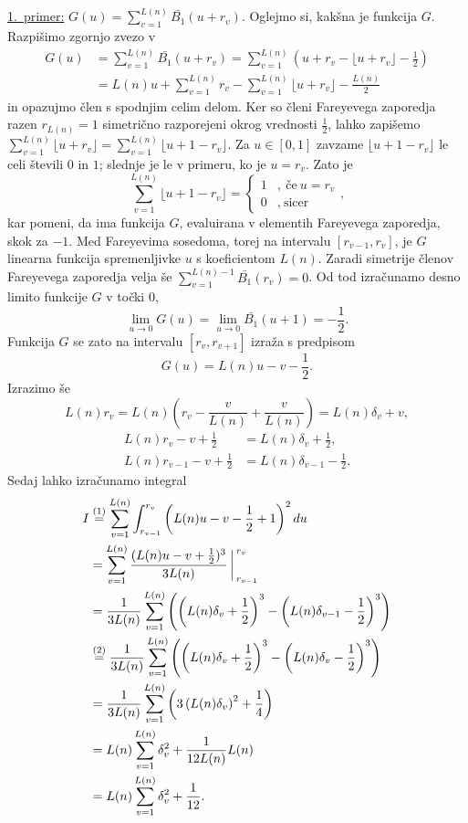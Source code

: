 \documentclass[mat1]{fmfdelo}
\begin{document}
\underline{1.~primer:} $G(u) = \sum_{v=1}^{L(n)} \bar{B_{1}}(u+r_v)$.
Oglejmo si, kakšna je funkcija $G$. Razpišimo zgornjo zvezo v
\begin{align}
G(u) &= \sum_{v=1}^{L(n)} \bar{B_{1}}(u+r_v) = \sum_{v=1}^{L(n)} \left(u+r_v - \lfloor u+r_v \rfloor - \frac{1}{2} \right) \nonumber \\
       &= L(n)u + \sum_{v=1}^{L(n)}r_v - \sum_{v=1}^{L(n)} \lfloor u+r_v \rfloor - \frac{L(n)}{2}
\end{align}
in opazujmo člen s spodnjim celim delom. Ker so členi Fareyevega zaporedja razen $r_{L(n)}=1$ simetrično razporejeni okrog vrednosti $\frac{1}{2}$, lahko zapišemo $\sum_{v=1}^{L(n)} \lfloor u+r_v \rfloor = \sum_{v=1}^{L(n)} \lfloor u+1-r_v \rfloor$. Za $u\in[0,1]$ zavzame $\lfloor u+1-r_v \rfloor$ le celi števili $0$ in $1$; slednje je le v primeru, ko je $u=r_{v}$. Zato je 
\[
\sum_{v=1}^{L(n)} \lfloor u+1-r_v \rfloor = \left\{
\begin{array}{rl}
	1 &,\ \textrm{če}\ u = r_{v}\\
	0 &,\ \textrm{sicer}
\end{array},
\right.
\]
kar pomeni, da ima funkcija $G$, evaluirana v elementih Fareyevega zaporedja, skok za $-1$. Med Fareyevima sosedoma, torej na intervalu $[r_{v-1},r_{v}]$, je $G$ linearna funkcija spremenljivke $u$ s koeficientom $L(n)$.
Zaradi simetrije členov Fareyevega zaporedja velja še $\sum_{v=1}^{L(n)-1} \bar{B_{1}}(r_v) = 0$. Od tod izračunamo desno limito funkcije $G$ v točki $0$,
\[ \lim_{u \to 0} G(u) = \lim_{u \to 0} \bar{B_{1}}(u+1) = -\frac{1}{2}. \]
Funkcija $G$ se zato na intervalu $[r_{v},r_{v+1}]$ izraža s predpisom
\[ G(u) = L(n)u - v - \frac{1}{2}. \]
%
Izrazimo še 
\[ L(n)r_{v} = L(n) \left( r_{v}-\frac{v}{L(n)}+\frac{v}{L(n)} \right) = L(n) \delta_{v} + v, \]
\begin{align*}
L(n)r_{v}-v+\frac{1}{2} &= L(n) \delta_{v} + \frac{1}{2}, \\
L(n)r_{v-1}-v+\frac{1}{2} &= L(n) \delta_{v-1} - \frac{1}{2}.
\end{align*}
%
Sedaj lahko izračunamo integral 
\begin{align}
\label{Eq:I1}
I &\stackrel{(1)}{=} \sum_{v=1}^{L(n)} \int_{r_{v-1}}^{r_{v}} \left( L(n)u-v-\frac{1}{2}+1 \right)^2 du \nonumber \\
  &= \sum_{v=1}^{L(n)} \frac{(L(n)u-v+\frac{1}{2})^3}{3L(n)} \bigg \arrowvert_{r_{v-1}}^{r_{v}} \nonumber \\
  &= \frac{1}{3L(n)} \sum_{v=1}^{L(n)} \left( \left(L(n) \delta_{v} + \frac{1}{2} \right)^3 - \left(L(n) \delta_{v-1} - \frac{1}{2} \right)^3 \right) \nonumber \\
  &\stackrel{(2)}{=} \frac{1}{3L(n)} \sum_{v=1}^{L(n)} \left( \left(L(n) \delta_{v} + \frac{1}{2} \right)^3 - \left(L(n) \delta_{v} - \frac{1}{2} \right)^3 \right) \nonumber \\
  &= \frac{1}{3L(n)} \sum_{v=1}^{L(n)} \left(3 \left(L(n) \delta_{v} \right)^2 + \frac{1}{4} \right) \nonumber \\
  &= L(n) \sum_{v=1}^{L(n)} \delta_{v}^2 + \frac{1}{12L(n)} L(n) \nonumber \\
  &= L(n) \sum_{v=1}^{L(n)} \delta_{v}^2 + \frac{1}{12}.
\end{align}
\end{document}
